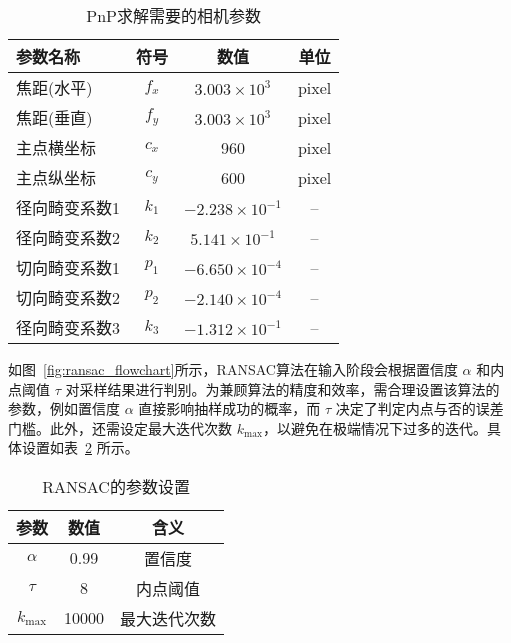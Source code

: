 \begin{table}[htbp]
	\centering
	\caption{PnP求解需要的相机参数}
	\label{tab:camera_params_solvepnp}
	\begin{tabular}{lccc}
		\toprule
		\textbf{参数名称} & \textbf{符号} & \textbf{数值} & \textbf{单位} \\
		\midrule
		焦距(水平) & $f_x$ & \(3.003\times10^{3}\) & pixel \\
		焦距(垂直) & $f_y$ & \(3.003\times10^{3}\) & pixel \\
		主点横坐标 & $c_x$ & 960 & pixel \\
		主点纵坐标 & $c_y$ & 600 & pixel \\
		径向畸变系数1 & $k_1$ & \(-2.238\times10^{-1}\) & -- \\
		径向畸变系数2 & $k_2$ & \(5.141\times10^{-1}\) & -- \\
		切向畸变系数1 & $p_1$ & \(-6.650\times10^{-4}\) & -- \\
		切向畸变系数2 & $p_2$ & \(-2.140\times10^{-4}\) & -- \\
		径向畸变系数3 & $k_3$ & \(-1.312\times10^{-1}\) & -- \\
		\bottomrule
	\end{tabular}
\end{table}





如图~\ref{fig:ransac_flowchart}所示，RANSAC算法在输入阶段会根据置信度 $\alpha$ 和内点阈值 $\tau$ 对采样结果进行判别。为兼顾算法的精度和效率，需合理设置该算法的参数，例如置信度 $\alpha$ 直接影响抽样成功的概率，而 $\tau$ 决定了判定内点与否的误差门槛。此外，还需设定最大迭代次数 $k_{\max}$，以避免在极端情况下过多的迭代。具体设置如表~\ref{tab:ransac_params_setting} 所示。


\begin{table}[h!]
	\centering
	\caption{RANSAC的参数设置}
	\label{tab:ransac_params_setting}
	\begin{tabular}{ccc}
		\toprule
		参数 & 数值 & 含义 \\
		\midrule
		$\alpha$   & 0.99   & 置信度 \\
		$\tau$     & 8      & 内点阈值 \\
		$k_{\max}$ & 10000  & 最大迭代次数 \\
		\bottomrule
	\end{tabular}
\end{table}


